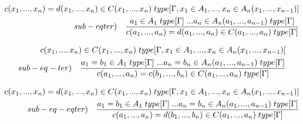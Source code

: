 \documentclass[10pt,a4paper, italian]{book}
\begin{document}
\begin{equation}
\begin{split}
c(x_1,...,x_n) = d(x_1,...,x_n)  \in C(x_1,...,x_n) \hspace{0.1cm}type[\Gamma, x_1 \in A_1,...,x_n \in A_n(x_1,...,x_{n-1})] \\ sub-eqter) \quad \frac{a_1 \in A_1\hspace{0.1cm}type[\Gamma]\hspace{0.1cm}...a_n \in A_n(a_1,...,a_{n-1})\hspace{0.1cm}type[\Gamma]}{ c(a_1,...,a_n) = d(a_1,...,a_n) \in C(a_1,...,a_n)\hspace{0.1cm}type[\Gamma]}
\end{split}
\end{equation}

\begin{equation}
\begin{split}
c(x_1,...,x_n) \in C(x_1,...,x_n) \hspace{0.1cm}type[\Gamma, x_1 \in A_1,...,x_n \in A_n(x_1,...,x_{n-1})] \\ sub-eq-ter) \quad \frac{a_1 = b_1 \in A_1\hspace{0.1cm}type[\Gamma]\hspace{0.1cm}...a_n = b_n \in A_n(a_1,...,a_{n-1})\hspace{0.1cm}type[\Gamma]}{ c(a_1,...,a_n) = c(b_1,...,b_n) \in C(a_1,...,a_n)\hspace{0.1cm}type[\Gamma]}
\end{split}
\end{equation}

\begin{equation}
\begin{split}
c(x_1,...,x_n) = d(x_1,...,x_n) \in C(x_1,...,x_n) \hspace{0.1cm}type[\Gamma, x_1 \in A_1,...,x_n \in A_n(x_1,...,x_{n-1})] \\ sub-eq-eqter) \quad \frac{a_1 = b_1 \in A_1\hspace{0.1cm}type[\Gamma]\hspace{0.1cm}...a_n = b_n \in A_n(a_1,...,a_{n-1})\hspace{0.1cm}type[\Gamma]}{ c(a_1,...,a_n) = d(b_1,...,b_n) \in C(a_1,...,a_n)\hspace{0.1cm}type[\Gamma]}
\end{split}
\end{equation}
\end{document}

